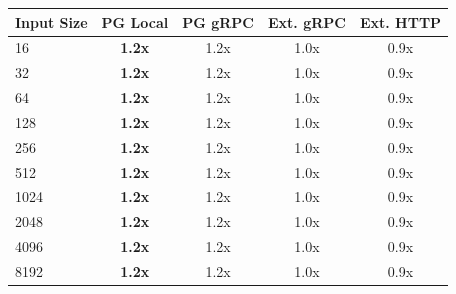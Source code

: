 \begin{tabular}{lcccc}
\toprule
\textbf{Input Size} & \textbf{PG Local} & \textbf{PG gRPC} & \textbf{Ext. gRPC} & \textbf{Ext. HTTP} \\
\midrule
16 & \textbf{1.2x} & 1.2x & 1.0x & 0.9x \\
32 & \textbf{1.2x} & 1.2x & 1.0x & 0.9x \\
64 & \textbf{1.2x} & 1.2x & 1.0x & 0.9x \\
128 & \textbf{1.2x} & 1.2x & 1.0x & 0.9x \\
256 & \textbf{1.2x} & 1.2x & 1.0x & 0.9x \\
512 & \textbf{1.2x} & 1.2x & 1.0x & 0.9x \\
1024 & \textbf{1.2x} & 1.2x & 1.0x & 0.9x \\
2048 & \textbf{1.2x} & 1.2x & 1.0x & 0.9x \\
4096 & \textbf{1.2x} & 1.2x & 1.0x & 0.9x \\
8192 & \textbf{1.2x} & 1.2x & 1.0x & 0.9x \\
\bottomrule
\end{tabular}
